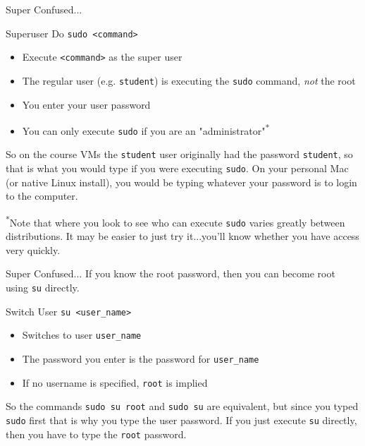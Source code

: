 \documentclass[11pt]{beamer}
\newcommand{\colbf}[1]{\textcolor{mLightBrown!77!black}{#1}}%
\newcommand{\tsup}{\textsuperscript}                        %
\begin{document}
\begin{frame}[fragile]{Super Confused...}
  \begin{block}{\colbf{S}uper\colbf{u}ser \colbf{Do}}
    \texttt{sudo <command>}
    \begin{itemize}
      \item Execute \texttt{<command>} as the super user
      \item The regular user (e.g. \texttt{student}) is executing the \texttt{sudo} command, \emph{not} the root
      \item You enter your user password
      \item You can only execute \texttt{sudo} if you are an "administrator"\tsup{*}
    \end{itemize}
  \end{block}

  So on the course VMs the \texttt{student} user originally had the password \texttt{student}, so that is what
  you would type if you were executing \texttt{sudo}.  On your personal Mac (or native Linux install), you would
  be typing whatever your password is to login to the computer.

  {\tiny \tsup{*}Note that where you look to see who can execute \texttt{sudo} varies greatly between distributions.  It may be
    easier to just try it...you'll know whether you have access very quickly.}
\end{frame}

\begin{frame}[fragile]{Super Confused...}
  If you know the root password, then you can become root using \texttt{su} directly.
  \begin{block}{\colbf{S}witch \colbf{U}ser}
    \texttt{su <user\_name>}
    \begin{itemize}
      \item Switches to user \texttt{user\_name}
      \item The password you enter is the password for \texttt{user\_name}
      \item If no username is specified, \texttt{root} is implied
    \end{itemize}
  \end{block}

  So the commands \texttt{sudo su root} and \texttt{sudo su} are equivalent, but since you typed \texttt{sudo}
  first that is why you type the user password.  If you just execute \texttt{su} directly, then you have to type
  the \texttt{root} password.
\end{frame}
\end{document}
